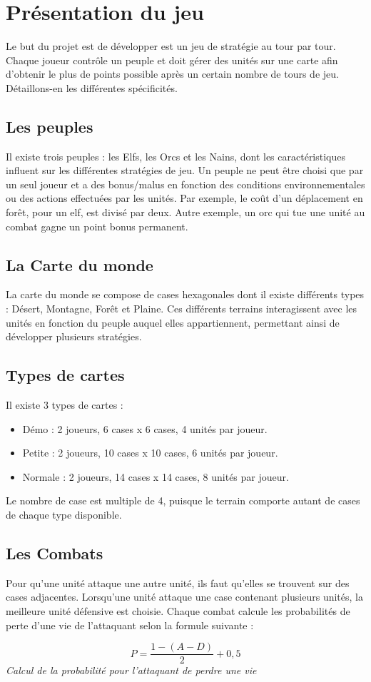 \section{Présentation du jeu}
Le but du projet est de développer est un jeu de stratégie au tour par tour. Chaque joueur contrôle un peuple et doit gérer des unités sur une carte afin d'obtenir le plus de points possible après un certain nombre de tours de jeu. Détaillons-en les différentes spécificités.
\subsection{Les peuples}
Il existe trois peuples : les Elfs, les Orcs et les Nains, dont les caractéristiques influent sur les différentes stratégies de jeu. Un peuple ne peut être choisi que par un seul joueur et a des bonus/malus en fonction des conditions environnementales ou des actions effectuées par les unités. Par exemple, le coût d'un déplacement en forêt, pour un elf, est divisé par deux. Autre exemple, un orc qui tue une unité au combat gagne un point bonus permanent.

\subsection{La Carte du monde}
La carte du monde se compose de cases hexagonales dont il existe différents types : Désert, Montagne, Forêt et Plaine. Ces différents terrains interagissent avec les unités en fonction du peuple auquel elles appartiennent, permettant ainsi de développer plusieurs stratégies.

\subsection{Types de cartes}
Il existe 3 types de cartes :
\begin{itemize}
  \item Démo : 2 joueurs, 6 cases x 6 cases, 4 unités par joueur.
  \item Petite : 2 joueurs, 10 cases x 10 cases, 6 unités par joueur.
  \item Normale :  2 joueurs, 14 cases x 14 cases, 8 unités par joueur.
\end{itemize}
Le nombre de case est multiple de 4, puisque le terrain comporte autant de cases de chaque type disponible.
\subsection{Les Combats}
Pour qu'une unité attaque une autre unité, ils faut qu'elles se trouvent sur des cases adjacentes. Lorsqu'une unité attaque une case contenant plusieurs unités, la meilleure unité défensive est choisie. Chaque combat calcule les probabilités de perte d'une vie de l'attaquant selon la formule suivante :
\bigskip
\begin{minipage}[b]{1\linewidth}
\centering
\begin{equation*}
P = \frac{1 - (A - D)}{2} + 0,5
\end{equation*}
\medskip
\textit{Calcul de la probabilité pour l'attaquant de perdre une vie}
\end{minipage}%

